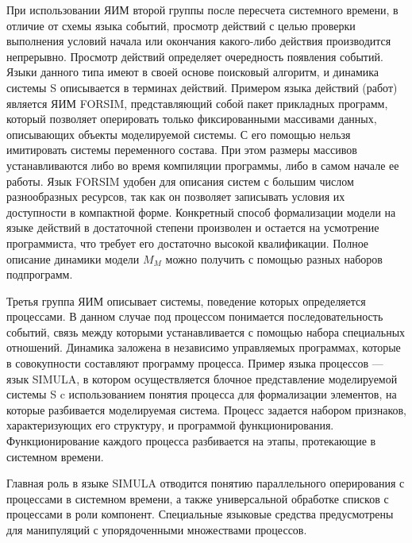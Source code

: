     При использовании ЯИМ второй группы после пересчета системного времени, в отличие от схемы языка событий, просмотр действий с целью проверки выполнения условий начала или окончания какого-либо действия производится непрерывно. Просмотр действий определяет очередность появления событий. Языки данного типа имеют в своей основе поисковый алгоритм, и динамика системы S описывается в терминах действий. Примером языка действий (работ) является ЯИМ FORSIM, представляющий собой пакет прикладных программ, который позволяет оперировать только фиксированными массивами данных, описывающих объекты моделируемой системы. С его помощью нельзя имитировать системы переменного состава. При этом размеры массивов  устанавливаются либо во время компиляции программы, либо в самом начале ее работы. Язык FORSIM удобен для описания систем с большим числом разнообразных ресурсов, так как он позволяет записывать условия их доступности в компактной форме. Конкретный способ формализации модели на языке действий в достаточной степени произволен и остается на усмотрение программиста, что требует его достаточно высокой квалификации. Полное описание динамики модели $M_{M}$ можно получить с помощью разных наборов подпрограмм.

    Третья группа ЯИМ описывает системы, поведение которых определяется процессами. В данном случае под процессом понимается последовательность событий, связь между которыми устанавливается с помощью набора специальных отношений. Динамика заложена в независимо управляемых программах, которые в совокупности составляют программу процесса. Пример языка процессов — язык SIMULA, в котором осуществляется блочное представление моделируемой системы S c использованием понятия процесса для формализации элементов, на которые разбивается моделируемая система. Процесс задается набором признаков, характеризующих его структуру, и программой функционирования. Функционирование каждого процесса разбивается на этапы, протекающие в системном времени.

    Главная роль в языке SIMULA отводится понятию параллельного оперирования с процессами в системном времени, а также универсальной обработке списков с процессами в роли компонент. Специальные языковые средства предусмотрены для манипуляций с упорядоченными множествами процессов.

